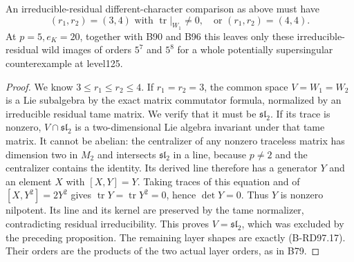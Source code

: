 \begin{corollary}
\label{cor:B-RD97-layers}
An irreducible-residual different-character comparison as above
must have
\[
 (r_1,r_2)=(3,4)\text{ with }\operatorname{tr}|_{W_1}\ne0,
 \quad\text{or }(r_1,r_2)=(4,4).                    \tag{B-RD97.17}
\]
At $p=5,e_K=20$, together with B90 and B96 this leaves only
these irreducible-residual wild images of orders $5^7$ and $5^8$
for a whole potentially supersingular counterexample at level125.
\end{corollary}
\begin{proof}
We know $3\le r_1\le r_2\le4$. If $r_1=r_2=3$, the common
space $V=W_1=W_2$ is a Lie subalgebra by the exact matrix
commutator formula, normalized by an irreducible residual tame
matrix. We verify that it must be $\mathfrak{sl}_2$.
If its trace is nonzero, $V\cap\mathfrak{sl}_2$ is a
two-dimensional Lie algebra invariant under that tame matrix.
It cannot be abelian: the centralizer of any nonzero traceless
matrix has dimension two in $M_2$ and intersects $\mathfrak{sl}_2$
in a line, because $p\ne2$ and the centralizer contains the identity.
Its derived line therefore has a generator $Y$ and an element
$X$ with $[X,Y]=Y$. Taking traces of this equation and of
$[X,Y^2]=2Y^2$ gives $\operatorname{tr}Y=
\operatorname{tr}Y^2=0$, hence $\det Y=0$.
Thus $Y$ is nonzero nilpotent. Its line and its kernel are
preserved by the tame normalizer, contradicting residual
irreducibility. This proves $V=\mathfrak{sl}_2$, which was
excluded by the preceding proposition. The remaining layer
shapes are exactly (B-RD97.17). Their orders are the products
of the two actual layer orders, as in B79.
\end{proof}

